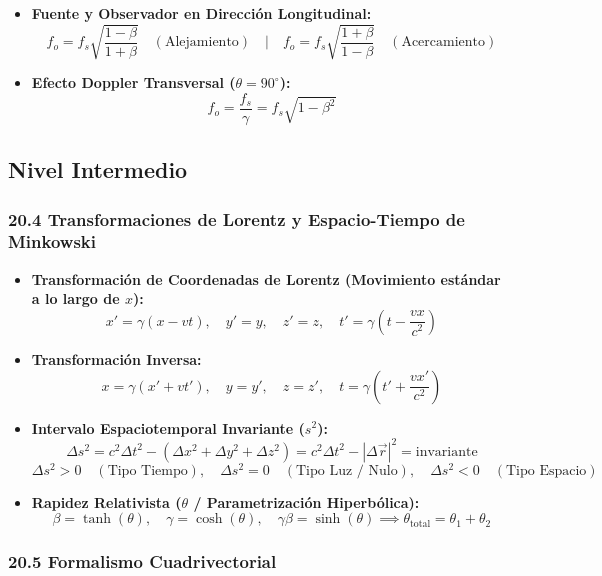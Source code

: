 \documentclass[11pt,a4paper]{article}
\begin{document}
\begin{itemize}
  \item \textbf{Fuente y Observador en Dirección Longitudinal:}
  \[
    f_o = f_s \sqrt{\frac{1 - \beta}{1 + \beta}} \quad (\text{Alejamiento}) \quad | \quad f_o = f_s \sqrt{\frac{1 + \beta}{1 - \beta}} \quad (\text{Acercamiento})
  \]
  \item \textbf{Efecto Doppler Transversal ($\theta = 90^\circ$):}
  \[
    f_o = \frac{f_s}{\gamma} = f_s \sqrt{1 - \beta^2}
  \]
\end{itemize}

\subsection*{Nivel Intermedio}

\subsubsection*{20.4 Transformaciones de Lorentz y Espacio-Tiempo de Minkowski}

\begin{itemize}
  \item \textbf{Transformación de Coordenadas de Lorentz (Movimiento estándar a lo largo de $x$):}
  \[
    x' = \gamma (x - v t), \quad y' = y, \quad z' = z, \quad t' = \gamma \left( t - \frac{v x}{c^2} \right)
  \]
  \item \textbf{Transformación Inversa:}
  \[
    x = \gamma (x' + v t'), \quad y = y', \quad z = z', \quad t = \gamma \left( t' + \frac{v x'}{c^2} \right)
  \]
  \item \textbf{Intervalo Espaciotemporal Invariante ($s^2$):}
  \[
    \Delta s^2 = c^2 \Delta t^2 - (\Delta x^2 + \Delta y^2 + \Delta z^2) = c^2 \Delta t^2 - |\Delta\vec{r}|^2 = \text{invariante}
  \]
  \[
    \Delta s^2 > 0 \quad (\text{Tipo Tiempo}), \quad \Delta s^2 = 0 \quad (\text{Tipo Luz / Nulo}), \quad \Delta s^2 < 0 \quad (\text{Tipo Espacio})
  \]
  \item \textbf{Rapidez Relativista ($\theta$ / Parametrización Hiperbólica):}
  \[
    \beta = \tanh(\theta), \quad \gamma = \cosh(\theta), \quad \gamma\beta = \sinh(\theta) \implies \theta_{\text{total}} = \theta_1 + \theta_2
  \]
\end{itemize}

\subsubsection*{20.5 Formalismo Cuadrivectorial}
\end{document}
